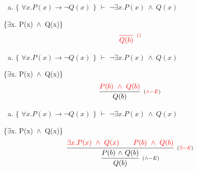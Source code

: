 \documentclass[aspectratio=43]{beamer}
\newcommand{\ex}{$\exists$}
\newcommand{\andd}{$\wedge$}
\begin{document}
    \begin{frame}[fragile]
    	
    	\begin{enumerate}[b)]
			
			\item $\{$ $\forall x.P(x)\to \neg Q(x)$ $\}$ $\vdash$ $ \neg\exists  x.P(x)\ \wedge\ Q(x)$ \\ 
			
		\end{enumerate}
        \{\ex  x. P(x)\ \andd\ Q(x)\}
        \vspace{100pt}
        \[
        \begin{array}{c}
		
        	\textcolor{red}{
            \infer[_{()}]
            {Q(b)}
            {}
            }
		\end{array}
        \]
        
	\end{frame}
    
    \begin{frame}[fragile]
    	
    	\begin{enumerate}[b)]
			
			\item $\{$ $\forall x.P(x)\to \neg Q(x)$ $\}$ $\vdash$ $ \neg\exists  x.P(x)\ \wedge\ Q(x)$ \\ 
			
		\end{enumerate}
        \{\ex  x. P(x)\ \andd\ Q(x)\}
        \vspace{95pt}
        \[
        \begin{array}{c}
		
        	\infer[_{(\textcolor{red}{\land-E})}]
            {Q(b)}
            {\textcolor{red}{P(b)\ \wedge \ Q(b)}}
		\end{array}
        \]
        
	\end{frame}
    
    \begin{frame}[fragile]
    	
    	\begin{enumerate}[b)]
			
			\item $\{$ $\forall x.P(x)\to \neg Q(x)$ $\}$ $\vdash$ $ \neg\exists  x.P(x)\ \wedge\ Q(x)$ \\ 
			
		\end{enumerate}
        \{\ex  x. P(x)\ \andd\ Q(x)\}
        \vspace{90pt}
        \[
        \begin{array}{c}
		
        	\infer[_{(\land-E)}]
            {Q(b)}
            {\infer[_{(\textcolor{red}{\exists-E})}]
                {P(b)\ $\andd$\ Q(b)}
            	{\textcolor{red}{\exists x.P(x)\ \wedge\ Q(x)} \hspace{20pt} \textcolor{red}{P(b)\ \wedge\ Q(b)}}
            }
		\end{array}
        \]
        
	\end{frame}
    
\end{document}
